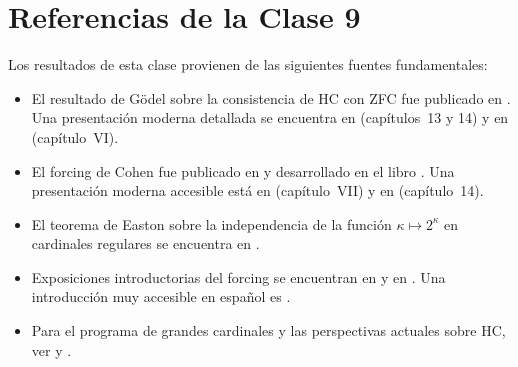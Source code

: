 \section*{Referencias de la Clase 9}

Los resultados de esta clase provienen de las siguientes fuentes fundamentales:

\begin{itemize}[leftmargin=2em]
  \item El resultado de Gödel sobre la consistencia de HC con ZFC fue publicado en \cite{godel1940}. Una presentación moderna detallada se encuentra en \cite{jech2003} (capítulos~13 y 14) y en \cite{kunen2011} (capítulo~VI).
  \item El forcing de Cohen fue publicado en \cite{cohen1963a, cohen1963b} y desarrollado en el libro \cite{cohen1966}. Una presentación moderna accesible está en \cite{kunen2011} (capítulo~VII) y en \cite{jech2003} (capítulo~14).
  \item El teorema de Easton sobre la independencia de la función $\kappa \mapsto 2^\kappa$ en cardinales regulares se encuentra en \cite{easton1970}.
  \item Exposiciones introductorias del forcing se encuentran en \cite{devlin1993} y en \cite{hrbacek1999}. Una introducción muy accesible en español es \cite{cori2001}.
  \item Para el programa de grandes cardinales y las perspectivas actuales sobre HC, ver \cite{kanamori2003} y \cite{woodin2001}.
\end{itemize}
